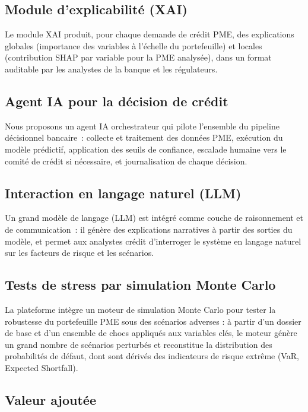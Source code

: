\documentclass[a4paper,12pt,oneside]{report}
\begin{document}
\subsection{Module d'explicabilité (XAI)}

Le module XAI produit, pour chaque demande de crédit PME, des explications globales
(importance des variables à l'échelle du portefeuille) et locales (contribution SHAP par
variable pour la PME analysée), dans un format auditable par les analystes de la banque et les
régulateurs.

\subsection{Agent IA pour la décision de crédit}

Nous proposons un agent IA orchestrateur qui pilote l'ensemble du pipeline
décisionnel bancaire~: collecte et traitement des données PME, exécution du modèle
prédictif, application des seuils de confiance, escalade humaine vers le comité de crédit
si nécessaire, et journalisation de chaque décision.

\subsection{Interaction en langage naturel (LLM)}

Un grand modèle de langage (LLM) est intégré comme couche de raisonnement et de
communication~: il génère des explications narratives à partir des sorties du modèle, et
permet aux analystes crédit d'interroger le système en langage naturel sur les
facteurs de risque et les scénarios.

\subsection{Tests de stress par simulation Monte Carlo}

La plateforme intègre un moteur de simulation Monte Carlo pour tester la robustesse du
portefeuille PME sous des scénarios adverses : à partir d'un dossier de base et d'un ensemble
de chocs appliqués aux variables clés, le moteur génère un grand nombre de scénarios perturbés
et reconstitue la distribution des probabilités de défaut, dont sont dérivés des indicateurs de
risque extrême (VaR, Expected Shortfall).

\subsection{Valeur ajoutée}
\end{document}
